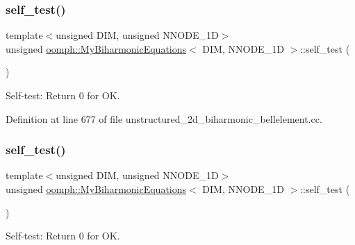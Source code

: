 \subsubsection{\texorpdfstring{self\+\_\+test()}{self\_test()}\hspace{0.1cm}{\footnotesize\ttfamily [1/2]}}
{\footnotesize\ttfamily template$<$unsigned D\+IM, unsigned N\+N\+O\+D\+E\+\_\+1D$>$ \\
unsigned \hyperlink{classoomph_1_1MyBiharmonicEquations}{oomph\+::\+My\+Biharmonic\+Equations}$<$ D\+IM, N\+N\+O\+D\+E\+\_\+1D $>$\+::self\+\_\+test (\begin{DoxyParamCaption}{ }\end{DoxyParamCaption})}



Self-\/test\+: Return 0 for OK. 



Definition at line 677 of file unstructured\+\_\+2d\+\_\+biharmonic\+\_\+bellelement.\+cc.

\mbox{\label{classoomph_1_1MyBiharmonicEquations_a6898ff065e57f8e765440da81075cf3d}} 
\subsubsection{\texorpdfstring{self\+\_\+test()}{self\_test()}\hspace{0.1cm}{\footnotesize\ttfamily [2/2]}}
{\footnotesize\ttfamily template$<$unsigned D\+IM, unsigned N\+N\+O\+D\+E\+\_\+1D$>$ \\
unsigned \hyperlink{classoomph_1_1MyBiharmonicEquations}{oomph\+::\+My\+Biharmonic\+Equations}$<$ D\+IM, N\+N\+O\+D\+E\+\_\+1D $>$\+::self\+\_\+test (\begin{DoxyParamCaption}{ }\end{DoxyParamCaption})}



Self-\/test\+: Return 0 for OK. 

\mbox{\label{classoomph_1_1MyBiharmonicEquations_a9da77a58e4d4a96e6cfe1eb708bca631}} 
